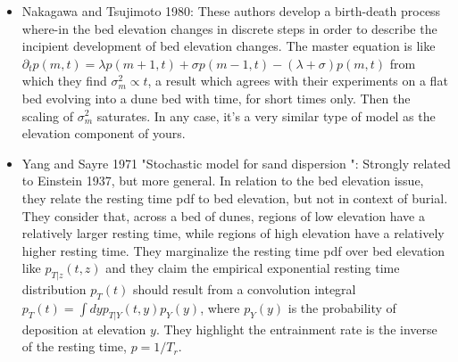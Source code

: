 \documentclass{article}
\begin{document}
\begin{itemize}
\item Nakagawa and Tsujimoto 1980:
These authors develop a birth-death process where-in the bed elevation changes in discrete steps in order to describe the incipient development of bed elevation changes. The master equation is like $\partial_t p(m,t) = \lambda p(m+1,t) + \sigma p(m-1,t) - (\lambda + \sigma) p(m,t)$ from which they find $\sigma_m^2 \propto t$, a result which agrees with their experiments on a flat bed evolving into a dune bed with time, for short times only. Then the scaling of $\sigma_m^2$ saturates. In any case, it's a very similar type of model as the elevation component of yours. 

\item Yang and Sayre 1971 "Stochastic model for sand dispersion ":
Strongly related to Einstein 1937, but more general. In relation to the bed elevation issue, they relate the resting time pdf to bed elevation, but not in context of burial. 
They consider that, across a bed of dunes, regions of low elevation have a relatively larger resting time, while regions of high elevation have a relatively higher resting time. 
They marginalize the resting time pdf over bed elevation like $p_{T|z}(t,z)$ and they claim the empirical exponential resting time distribution $p_T(t)$ should result from a convolution integral $p_T(t) = \int dy p_{T|Y}(t,y)p_Y(y)$, where $p_Y(y)$ is the probability of deposition at elevation $y$. 
They highlight the entrainment rate is the inverse of the resting time, $p = 1/T_r$. 


\end{itemize}
\end{document}
